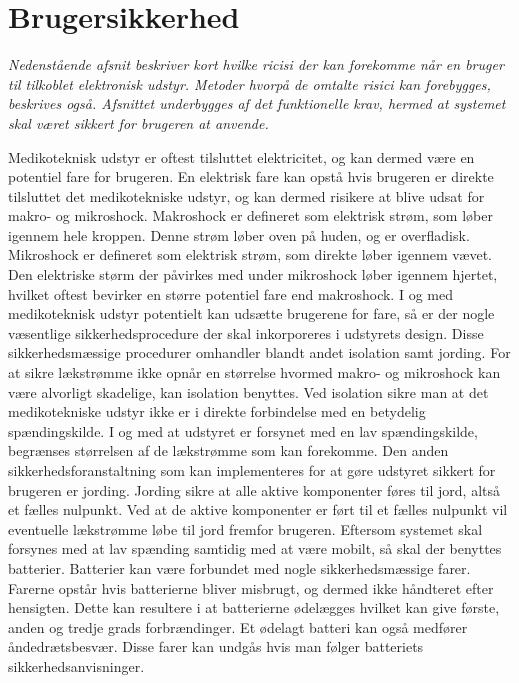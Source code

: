 \section{Brugersikkerhed}
\textit{Nedenstående afsnit beskriver kort hvilke ricisi der kan forekomme når en bruger til tilkoblet elektronisk udstyr. Metoder hvorpå de omtalte risici kan forebygges, beskrives også. Afsnittet underbygges af det funktionelle krav, hermed at systemet skal været sikkert for brugeren at anvende.}

Medikoteknisk udstyr er oftest tilsluttet elektricitet, og  kan dermed være en potentiel fare for brugeren. En elektrisk fare kan opstå hvis brugeren er direkte tilsluttet det medikotekniske udstyr, og kan dermed risikere at blive udsat for makro- og mikroshock. Makroshock er defineret som elektrisk strøm, som løber igennem hele kroppen. Denne strøm løber oven på huden, og er overfladisk. Mikroshock er defineret som elektrisk strøm, som direkte løber igennem vævet. Den elektriske størm der påvirkes med under mikroshock løber igennem hjertet, hvilket oftest bevirker en større potentiel fare end makroshock. \citep{Webster2011} \newline
I og med medikoteknisk udstyr potentielt kan udsætte brugerene for fare, så er der nogle væsentlige sikkerhedsprocedure der skal inkorporeres i udstyrets design. Disse sikkerhedsmæssige procedurer omhandler blandt andet isolation samt jording. For at sikre lækstrømme ikke opnår en størrelse hvormed makro- og mikroshock kan være alvorligt skadelige, kan isolation benyttes. Ved isolation sikre man at det medikotekniske udstyr ikke er i direkte forbindelse med en betydelig spændingskilde. I og med at udstyret er forsynet med en lav spændingskilde, begrænses størrelsen af de lækstrømme som kan forekomme. Den anden sikkerhedsforanstaltning som kan implementeres for at gøre udstyret sikkert for brugeren er jording. Jording sikre at alle aktive komponenter føres til jord, altså et fælles nulpunkt. Ved at de aktive komponenter er ført til et fælles nulpunkt vil eventuelle lækstrømme løbe til jord fremfor brugeren. \citep{Webster2011} \newline 
Eftersom systemet skal forsynes med at lav spænding samtidig med at være mobilt, så skal der benyttes batterier. Batterier kan være forbundet med nogle sikkerhedsmæssige farer. Farerne opstår hvis batterierne bliver misbrugt, og dermed ikke håndteret efter hensigten. Dette kan resultere i at batterierne ødelægges hvilket kan give første, anden og tredje grads forbrændinger. Et ødelagt batteri kan også medfører åndedrætsbesvær. Disse farer kan undgås hvis man følger batteriets sikkerhedsanvisninger. \citep{NREL2011}
